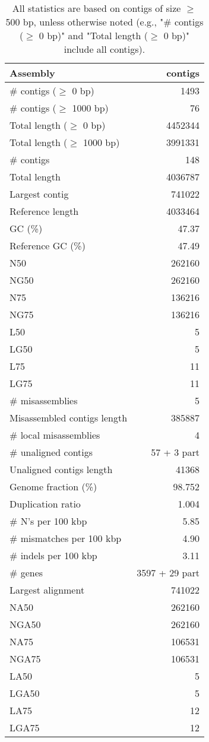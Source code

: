 \documentclass[12pt,a4paper]{article}
\begin{document}
\begin{table}[ht]
\begin{center}
\caption{All statistics are based on contigs of size $\geq$ 500 bp, unless otherwise noted (e.g., "\# contigs ($\geq$ 0 bp)" and "Total length ($\geq$ 0 bp)" include all contigs).}
\begin{tabular}{|l*{1}{|r}|}
\hline
Assembly & contigs \\ \hline
\# contigs ($\geq$ 0 bp) & 1493 \\ \hline
\# contigs ($\geq$ 1000 bp) & 76 \\ \hline
Total length ($\geq$ 0 bp) & 4452344 \\ \hline
Total length ($\geq$ 1000 bp) & 3991331 \\ \hline
\# contigs & 148 \\ \hline
Total length & 4036787 \\ \hline
Largest contig & 741022 \\ \hline
Reference length & 4033464 \\ \hline
GC (\%) & 47.37 \\ \hline
Reference GC (\%) & 47.49 \\ \hline
N50 & 262160 \\ \hline
NG50 & 262160 \\ \hline
N75 & 136216 \\ \hline
NG75 & 136216 \\ \hline
L50 & 5 \\ \hline
LG50 & 5 \\ \hline
L75 & 11 \\ \hline
LG75 & 11 \\ \hline
\# misassemblies & 5 \\ \hline
Misassembled contigs length & 385887 \\ \hline
\# local misassemblies & 4 \\ \hline
\# unaligned contigs & 57 + 3 part \\ \hline
Unaligned contigs length & 41368 \\ \hline
Genome fraction (\%) & 98.752 \\ \hline
Duplication ratio & 1.004 \\ \hline
\# N's per 100 kbp & 5.85 \\ \hline
\# mismatches per 100 kbp & 4.90 \\ \hline
\# indels per 100 kbp & 3.11 \\ \hline
\# genes & 3597 + 29 part \\ \hline
Largest alignment & 741022 \\ \hline
NA50 & 262160 \\ \hline
NGA50 & 262160 \\ \hline
NA75 & 106531 \\ \hline
NGA75 & 106531 \\ \hline
LA50 & 5 \\ \hline
LGA50 & 5 \\ \hline
LA75 & 12 \\ \hline
LGA75 & 12 \\ \hline
\end{tabular}
\end{center}
\end{table}
\end{document}
